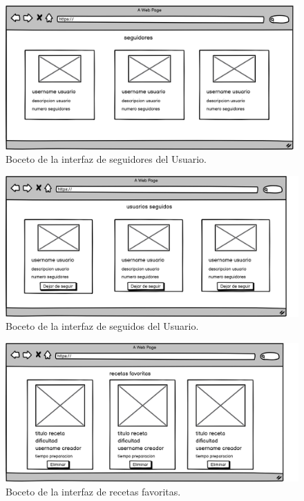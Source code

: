  

     \begin{figure}[H]
    \centering
    \includegraphics[scale=0.20]{img/seguidores-usuario.jpg}
    \caption{Boceto de la interfaz de seguidores del Usuario.}
    \label{fig:seguidores-usuario}
\end{figure}
    
  

     \begin{figure}[H]
    \centering
    \includegraphics[scale=0.20]{img/seguidos-usuario.jpg}
    \caption{Boceto de la interfaz de seguidos del Usuario.}
    \label{fig:seguidos-usuario}
\end{figure}
    
   

      \begin{figure}[H]
    \centering
    \includegraphics[scale=0.20]{img/favoritas-recetas.jpg}
    \caption{Boceto de la interfaz de recetas favoritas.}
    \label{fig:favoritas-recetas}
\end{figure}
    
